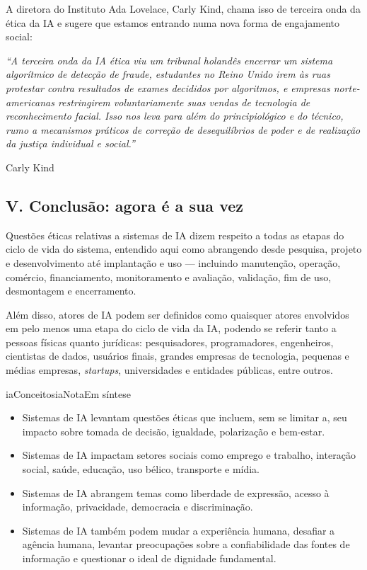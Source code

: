 \documentclass[
  11pt,
]{article}
\renewenvironment{quote}
  {\begin{tcolorbox}[
      breakable, enhanced jigsaw, rounded corners,
      arc=3pt, boxrule=0pt, frame hidden,
      colback=iaCaso,
      borderline west={3pt}{0pt}{iaRiscos},
      left=12pt, right=10pt, top=9pt, bottom=9pt,
      before skip=9pt, after skip=9pt]}
  {\end{tcolorbox}}
\newenvironment{nota}[1][Nota]{\begin{iabox}{iaConceitos}{iaNota}{#1}}{\end{iabox}}
\begin{document}
A diretora do Instituto Ada Lovelace, Carly Kind, chama isso de terceira
onda da ética da IA e sugere que estamos entrando numa nova forma de
engajamento social:

\begin{quote}
\emph{``A terceira onda da IA ética viu um tribunal holandês encerrar um
sistema algorítmico de detecção de fraude, estudantes no Reino Unido
irem às ruas protestar contra resultados de exames decididos por
algoritmos, e empresas norte-americanas restringirem voluntariamente
suas vendas de tecnologia de reconhecimento facial. Isso nos leva para
além do principiológico e do técnico, rumo a mecanismos práticos de
correção de desequilíbrios de poder e de realização da justiça
individual e social.''}

Carly Kind
\end{quote}

\subsection{V. Conclusão: agora é a sua
vez}\label{v.-conclusuxe3o-agora-uxe9-a-sua-vez}

Questões éticas relativas a sistemas de IA dizem respeito a todas as
etapas do ciclo de vida do sistema, entendido aqui como abrangendo desde
pesquisa, projeto e desenvolvimento até implantação e uso --- incluindo
manutenção, operação, comércio, financiamento, monitoramento e
avaliação, validação, fim de uso, desmontagem e encerramento.

Além disso, atores de IA podem ser definidos como quaisquer atores
envolvidos em pelo menos uma etapa do ciclo de vida da IA, podendo se
referir tanto a pessoas físicas quanto jurídicas: pesquisadores,
programadores, engenheiros, cientistas de dados, usuários finais,
grandes empresas de tecnologia, pequenas e médias empresas,
\emph{startups}, universidades e entidades públicas, entre outros.

\begin{nota}[Em síntese]

\begin{itemize}
\item
  Sistemas de IA levantam questões éticas que incluem, sem se limitar a,
  seu impacto sobre tomada de decisão, igualdade, polarização e
  bem-estar.
\item
  Sistemas de IA impactam setores sociais como emprego e trabalho,
  interação social, saúde, educação, uso bélico, transporte e mídia.
\item
  Sistemas de IA abrangem temas como liberdade de expressão, acesso à
  informação, privacidade, democracia e discriminação.
\item
  Sistemas de IA também podem mudar a experiência humana, desafiar a
  agência humana, levantar preocupações sobre a confiabilidade das
  fontes de informação e questionar o ideal de dignidade fundamental.
\end{itemize}

\end{nota}
\end{document}
